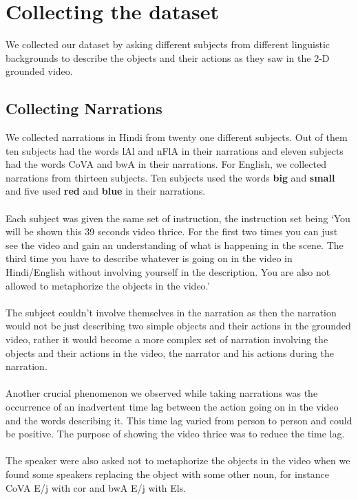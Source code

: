 \documentclass[12pt, a4paper]{report}
\begin{document}
\chapter{Collecting the dataset}

We collected our dataset by asking different subjects from different linguistic backgrounds to describe the objects and their actions as they saw in the 2-D grounded video.

\section{Collecting Narrations}

We collected narrations in Hindi from twenty one different subjects. Out of them ten subjects had the words {\dn lAl} and {\dn nFlA} in their narrations and eleven subjects had the words {\dn CoVA} and {\dn bwA} in their narrations. For English, we collected narrations from thirteen subjects. Ten subjects used the words \textbf{big} and \textbf{small} and five used \textbf{red} and \textbf{blue} in their narrations.\\
\\
Each subject was given the same set of instruction, the instruction set being `You will be shown this 39 seconds video thrice. For the first two times you can just see the video and gain an understanding of what is happening in the scene. The third time you have to describe whatever is going on in the video in Hindi/English without involving yourself in the description. You are also not allowed to metaphorize the objects in the video.' \\
\\
The subject couldn’t involve themselves in the narration as then the narration would not be just describing two simple objects and their actions in the grounded video, rather it would become a more complex set of narration involving the objects and their actions in the video, the narrator and his actions during the narration.\\
\\
Another crucial phenomenon we observed while taking narrations was the occurrence of an inadvertent time lag between the action going on in the video and the words describing it. This time lag varied from person to person and could be positive. The purpose of showing the video thrice was to reduce the time lag.\\
\\
The speaker were also asked not to metaphorize the objects in the video when we found some speakers replacing the object with some other noun, for instance {\dn CoVA E/j} with {\dn cor} and {\dn bwA E/j} with {\dn {}Els}.
\end{document}
